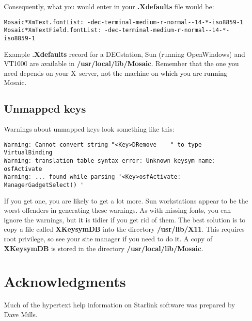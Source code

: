 Consequently, what you would enter in your {\bf .Xdefaults} file would be:

\begin{verbatim}
Mosaic*XmText.fontList: -dec-terminal-medium-r-normal--14-*-iso8859-1
Mosaic*XmTextField.fontList: -dec-terminal-medium-r-normal--14-*-iso8859-1
\end{verbatim}

Example {\bf .Xdefaults} record for a DECstation, Sun (running OpenWindows) and
VT1000 are available in {\bf /usr/local/lib/Mosaic}. Remember that the one you
need depends on your X~server, not the machine on which you are running Mosaic.

\subsection{Unmapped keys}

Warnings about unmapped keys look something like this:

\begin{verbatim}
Warning: Cannot convert string "<Key>DRemove    " to type VirtualBinding
Warning: translation table syntax error: Unknown keysym name: osfActivate
Warning: ... found while parsing '<Key>osfActivate:     ManagerGadgetSelect() '
\end{verbatim}

If you get one, you are likely to get a lot more. Sun workstations appear to be
the worst offenders in generating these warnings. As with missing fonts, you
can ignore the warnings, but it is tidier if you get rid of them. The best
solution is to copy a file called {\bf XKeysymDB} into the directory {\bf
/usr/lib/X11}. This requires root privilege, so see your site manager if you
need to do it. A copy of {\bf XKeysymDB} is stored in the directory {\bf
/usr/local/lib/Mosaic}.

\section{Acknowledgments}

Much of the hypertext help information on Starlink software was prepared by
Dave Mills.


